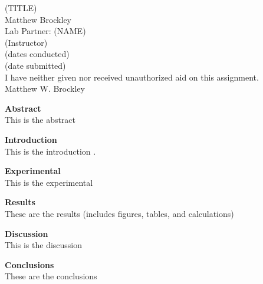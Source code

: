 \documentclass[12pt]{article}
\begin{document}
\begin{center}
(TITLE)\\
Matthew Brockley\\
Lab Partner: (NAME)\\
(Instructor)\\
(dates conducted)\\
(date submitted)\\
I have neither given nor received unauthorized aid on this assignment.\\
Matthew W. Brockley
\end{center}

\newpage
\begin{flushleft}
\textbf{Abstract}\\
\setlength{\parindent}{0.5in}
This is the abstract

\newpage
\noindent\textbf{Introduction}\\
This is the introduction \cite{giddings2020characterization}.

\newpage
\noindent\textbf{Experimental}\\
This is the experimental \cite{bontemps2018global}

\newpage
\noindent\textbf{Results}\\
These are the results (includes figures, tables, and calculations)

\newpage
\noindent\textbf{Discussion}\\
This is the discussion

\newpage
\noindent\textbf{Conclusions}\\
These are the conclusions

\newpage
\printbibliography


\end{flushleft}
\end{document}
